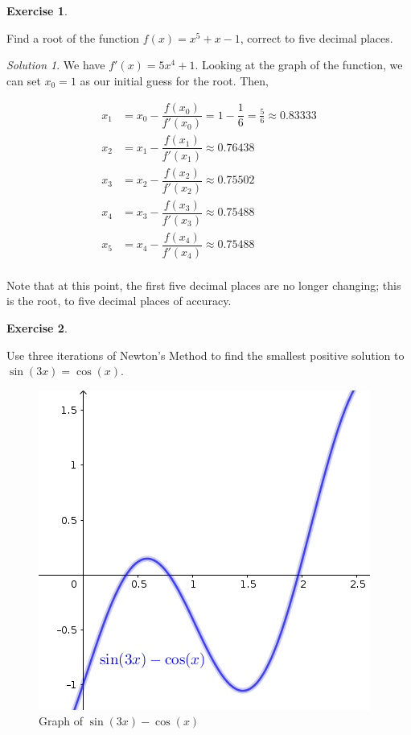 \documentclass[
]{book}
\theoremstyle{definition}
\theoremstyle{definition}
\theoremstyle{definition}
\newtheorem{exercise}{Exercise}[chapter]
\theoremstyle{definition}
\theoremstyle{remark}
\newtheorem*{solution}{Solution}
\begin{document}
\begin{exercise}
\protect\hypertarget{exr:unlabeled-div-132}{}\label{exr:unlabeled-div-132}

Find a root of the function \(f(x)=x^5+x-1\), correct to five decimal places.

\end{exercise}

\begin{solution}

We have \(f'(x)=5x^4+1\). Looking at the graph of the function, we can set \(x_0=1\) as our initial guess for the root. Then,

\begin{align*}
x_1 &=x_0-\dfrac{f(x_0)}{f'(x_0)}=1-\dfrac{1}{6}=\frac{5}{6}\approx 0.83333 \\
x_2 &= x_1-\dfrac{f(x_1)}{f'(x_1)}\approx 0.76438 \\
x_3 &= x_2-\dfrac{f(x_2)}{f'(x_2)}\approx 0.75502 \\
x_4 &= x_3-\dfrac{f(x_3)}{f'(x_3)}\approx 0.75488 \\
x_5 &= x_4-\dfrac{f(x_4)}{f'(x_4)}\approx 0.75488 \\
\end{align*}

Note that at this point, the first five decimal places are no longer changing; this is the root, to five decimal places of accuracy.

\end{solution}

\begin{exercise}
\protect\hypertarget{exr:unlabeled-div-134}{}\label{exr:unlabeled-div-134}

Use three iterations of Newton's Method to find the smallest positive solution to \(\sin(3x)=\cos(x)\).

\begin{figure}

{\centering \includegraphics[width=0.5\linewidth]{images/lec-18-ex-2} 

}

\caption{Graph of $\sin(3x)-\cos(x)$}\label{fig:unnamed-chunk-32}
\end{figure}

\end{exercise}
\end{document}
